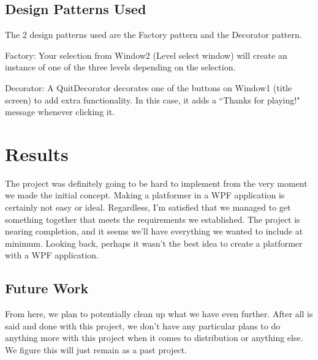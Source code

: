 \documentclass[10pt,conference,onecolumn,compsoc]{IEEEtran}
\begin{document}
\subsection{Design Patterns Used}
The 2 design patterns used are the Factory pattern and the Decorator pattern.

Factory: Your selection from Window2 (Level select window) will create an instance of one of the three levels depending on the selection.

Decorator: A QuitDecorator decorates one of the buttons on Window1 (title screen) to add extra functionality. In this case, it adds a ``Thanks for playing!" message whenever clicking it.


\section{Results}
The project was definitely going to be hard to implement from the very moment we made the initial concept. Making a platformer in a WPF application is certainly not easy or ideal. Regardless, I'm satisfied that we managed to get something together that meets the requirements we established. The project is nearing completion, and it seems we'll have everything we wanted to include at minimum. Looking back, perhaps it wasn't the best idea to create a platformer with a WPF application.

\subsection{Future Work}
From here, we plan to potentially clean up what we have even further. After all is said and done with this project, we don't have any particular plans to do anything more with this project when it comes to distribution or anything else. We figure this will just remain as a past project.










\end{document}
